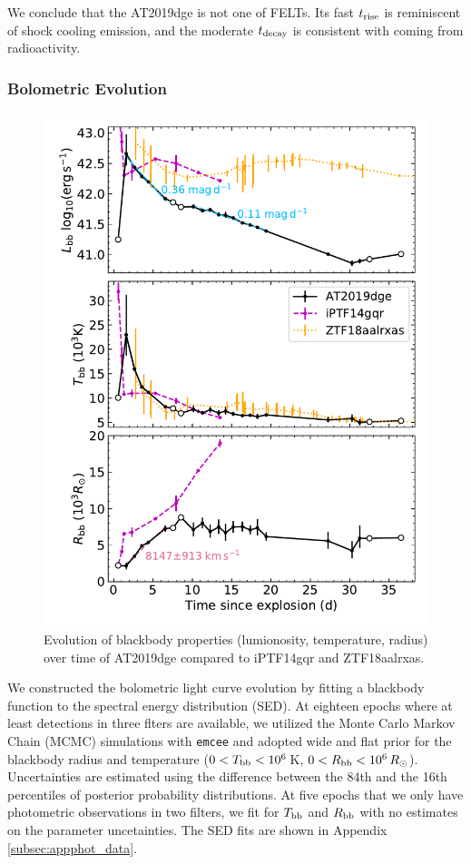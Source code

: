 \documentclass[twocolumn]{aastex63}
\begin{document}
\begin{CJK*}{UTF8}{gbsn}
We conclude that the AT2019dge is not one of FELTs. Its fast $t_{\rm rise}$ is reminiscent of shock 
cooling emission, and the moderate $t_{\rm decay}$ is consistent with coming from radioactivity.

\subsubsection{Bolometric Evolution}
\begin{figure}[!htbp] 
	\centering
	\includegraphics[width=\columnwidth]{figures/Tbb_Rbb.pdf}
	\caption{Evolution of blackbody properties (lumionosity, temperature, radius) over time of 
		AT2019dge compared to iPTF14gqr and ZTF18aalrxas.}
	\label{fig:Tbb_Rbb_Lbb}
\end{figure}

We constructed the bolometric light curve evolution by fitting a blackbody function to the spectral 
energy distribution (SED). At eighteen epochs where at least detections in three flters are available, we 
utilized the Monte Carlo Markov Chain (MCMC) simulations with \texttt{emcee} 
\citep{Foreman-Mackey2013} and adopted wide and flat prior for the blackbody radius and 
temperature ($0<T_{\rm bb}<10^6$\,K, $0<R_{\rm bb}<10^6\,R_\odot$). Uncertainties are estimated 
using the difference between the 84th and the 16th percentiles of posterior probability distributions. At 
five epochs that we only have photometric observations in two filters, we fit for $T_{\rm bb}$ and 
$R_{\rm bb}$ with no estimates on the parameter uncetainties. The SED fits are shown in 
Appendix \ref{subsec:appphot_data}. 


\end{CJK*}
\end{document}
